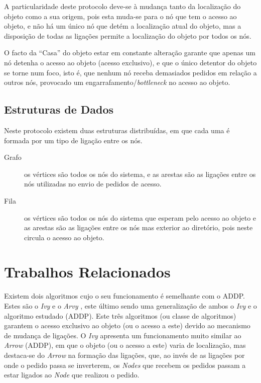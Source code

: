  

\noindent A particularidade deste protocolo deve-se à mudança tanto da localização do objeto como a sua origem, pois esta muda-se para o nó que tem o acesso ao objeto, e não há um único nó que detém a localização atual do objeto, mas a disposição de todas as ligações permite a localização do objeto por todos os nós.

O facto da ``Casa'' do objeto estar em constante alteração garante que apenas um nó detenha o acesso ao objeto (acesso exclusivo), e que o único detentor do objeto se torne num foco, isto é, que nenhum nó receba demasiados pedidos em relação a outros nós, provocado um engarrafamento/\emph{bottleneck} no acesso ao objeto.


\subsection*{Estruturas de Dados}
Neste protocolo existem duas estruturas distribuídas, em que cada uma é formada por um tipo de ligação entre os nós.

\begin{description} 
    \item [Grafo] os vértices são todos os nós do sistema, e as arestas são as ligações entre os nós utilizadas no envio de pedidos de acesso.
    \item [Fila] os vértices são todos os nós do sistema que esperam pelo acesso ao objeto  e as arestas são as ligações entre os nós mas exterior ao diretório, pois neste circula o acesso ao objeto.
\end{description}

\section{Trabalhos Relacionados}
\label{motivacao:sec:trabalhos_relacionados}

Existem dois algoritmos cujo o seu funcionamento é semelhante com o \acs*{ADDP}.
Estes são o \emph{Ivy} \cite{Ivy} e o \emph{Arvy} \cite{Arvy}, este último sendo uma generalização de ambos o \emph{Ivy} e o algoritmo estudado (\acs{ADDP}).
Este três algoritmos (ou classe de algoritmos) garantem o acesso exclusivo ao objeto (ou o acesso a este) devido ao mecanismo de mudança de ligações.
O \emph{Ivy} apresenta um funcionamento muito similar ao \emph{Arrow} (\acs*{ADDP}),
em que o objeto (ou o acesso a este) varia de localização,
mas destaca-se do \emph{Arrow} na formação das ligações, que,
ao invés de as ligações por onde o pedido passa se inverterem,
os \emph{Nodes} que recebem os pedidos passam a estar ligados ao \emph{Node} que realizou o pedido.

